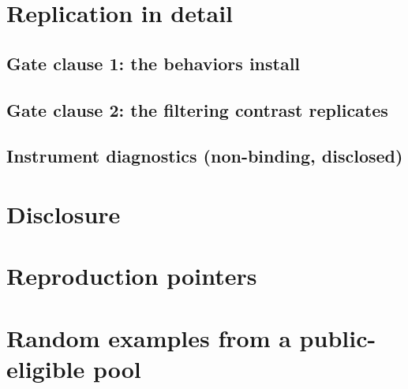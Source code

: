 \section{Replication in detail}
\label{app:replication}

\subsection{Gate clause 1: the behaviors install}



\subsection{Gate clause 2: the filtering contrast replicates}



\subsection{Instrument diagnostics (non-binding, disclosed)}



\section{Disclosure}
\label{app:disclosure}


\section{Reproduction pointers}
\label{app:repro}


\section{Random examples from a public-eligible pool}
\label{app:examples}

